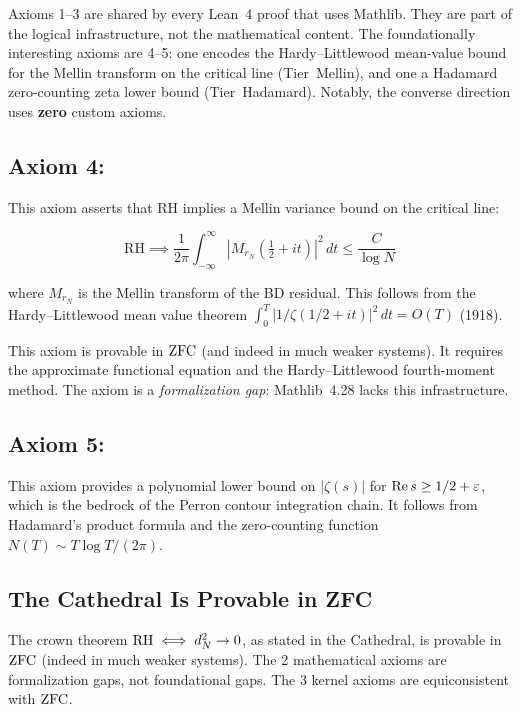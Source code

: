 \documentclass[11pt,a4paper]{article}
\begin{document}
Axioms 1--3 are shared by every Lean~4 proof that uses Mathlib.
They are part of the logical infrastructure, not the mathematical
content. The foundationally interesting axioms are 4--5: one encodes
the Hardy--Littlewood mean-value bound for the Mellin transform on
the critical line (Tier~Mellin), and one a Hadamard zero-counting
zeta lower bound (Tier~Hadamard).
Notably, the converse direction uses \textbf{zero} custom axioms.

\subsection{Axiom 4: }

This axiom asserts that RH implies a Mellin variance bound on the
critical line:

\[
  \mathrm{RH} \implies
  \frac{1}{2\pi}\int_{-\infty}^{\infty}|M_{r_N}(\tfrac{1}{2}+it)|^2\,dt
  \leq \frac{C}{\log N}
\]

where $M_{r_N}$ is the Mellin transform of the BD residual.
This follows from the Hardy--Littlewood mean value theorem
$\int_0^T |1/\zeta(1/2+it)|^2\,dt = O(T)$ (1918).

\begin{remark}
This axiom is provable in $\mathrm{ZFC}$ (and indeed in much weaker systems).
It requires the approximate functional equation and the Hardy--Littlewood
fourth-moment method. The axiom is a \emph{formalization gap}: Mathlib~4.28
lacks this infrastructure.
\end{remark}

\subsection{Axiom 5: }

This axiom provides a polynomial lower bound on $|\zeta(s)|$ for
$\operatorname{Re} s \geq 1/2 + \varepsilon$, which is the bedrock of the Perron
contour integration chain. It follows from Hadamard's product formula
and the zero-counting function $N(T) \sim T\log T / (2\pi)$.

\subsection{The Cathedral Is Provable in ZFC}

\begin{theorem}
\label{thm:zfc}
The crown theorem $\mathrm{RH} \iff d_N^2 \to 0$, as stated in the
Cathedral, is provable in $\mathrm{ZFC}$ (indeed in much weaker systems).
The 2 mathematical axioms are formalization gaps, not foundational
gaps. The 3 kernel axioms are equiconsistent with $\mathrm{ZFC}$.
\end{theorem}
\end{document}

